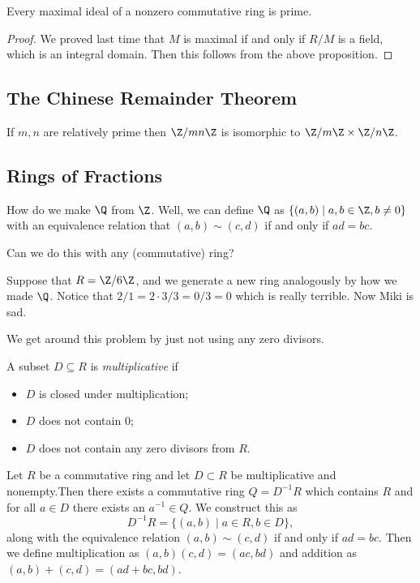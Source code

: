 \begin{proposition}
Every maximal ideal of a nonzero commutative ring is prime.
\end{proposition}

\begin{proof}
We proved last time that $M$ is maximal if and only if $R/M$ is a field, which is an integral domain. Then this follows from the above proposition.
\end{proof}

\subsection{The Chinese Remainder Theorem}

\begin{theorem}
If $m,n$ are relatively prime then $\Z/mn\Z$ is isomorphic to $\Z/m\Z \times \Z/n\Z$.
\end{theorem}

\subsection{Rings of Fractions}

How do we make $\Q$ from $\Z$. Well, we can define $\Q$ as $\{(a,b) \mid a,b \in \Z, b \not= 0\}$ with an equivalence relation that $(a,b) \sim (c,d)$ if and only if $ad = bc$.

Can we do this with any (commutative) ring?

\begin{example}
Suppose that $R = \Z/6\Z$, and we generate a new ring analogously by how we made $\Q$. Notice that $2/1 = 2 \cdot 3 / 3 = 0 / 3 = 0$ which is really terrible. Now Miki is sad.
\end{example}

We get around this problem by just not using any zero divisors.

\begin{definition}
A subset $D \subseteq R$ is \emph{multiplicative} if 
\begin{itemize}
\item $D$ is closed under multiplication;
\item $D$ does not contain $0$;
\item $D$ does not contain any zero divisors from $R$.
\end{itemize}
\end{definition}

\begin{theorem}
Let $R$ be a commutative ring and let $D \subset R$ be multiplicative and nonempty.Then there exists a commutative ring $Q = D^{-1}R$ which contains $R$ and for all $a \in D$ there exists an $a^{-1} \in Q$. We construct this as 
\[ D^{-1}R = \{(a,b) \mid a \in R, b \in D\}, \]
along with the equivalence relation $(a,b) \sim (c,d)$ if and only if $ad = bc$. Then we define multiplication as $(a,b)(c,d) = (ac,bd)$ and addition as $(a,b) + (c,d) = (ad + bc, bd)$.
\end{theorem}

